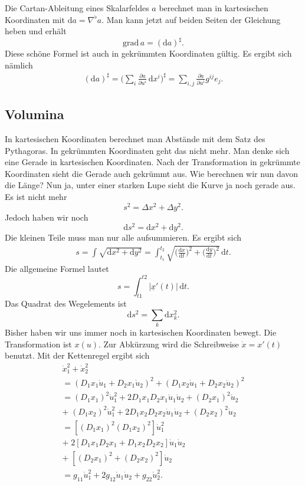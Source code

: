 \documentclass[a4paper,10pt,fleqn,twocolumn,twoside]{article}
\begin{document}
Die Cartan-Ableitung eines Skalarfeldes $a$ berechnet man in
kartesischen Koordinaten mit
$\mathrm da = \nabla^\flat a$. 
Man kann jetzt auf beiden Seiten der Gleichung heben und erhält
\[\mathrm{grad}\,a = (\mathrm da)^\sharp.\]
Diese schöne Formel ist auch in gekrümmten Koordinaten gültig.
Es ergibt sich nämlich
\begin{gather*}
(\mathrm da)^\sharp
= \Big(\sum_i \frac{\partial a}{\partial u^i}
\,\mathrm dx^i\Big)^\sharp
= \sum_{i,j} \frac{\partial a}{\partial u^i}g^{ij}e_j.
\end{gather*}

\subsection{Volumina}

In kartesischen Koordinaten berechnet man Abstände mit dem Satz des
Pythagoras. In gekrümmten Koordinaten geht das nicht mehr. Man denke
sich eine Gerade in kartesischen Koordinaten. Nach der Transformation
in gekrümmte Koordinaten sieht die Gerade auch gekrümmt aus. Wie
berechnen wir nun davon die Länge? Nun ja, unter einer starken Lupe
sieht die Kurve ja noch gerade aus. Es ist nicht mehr
\[s^2 = \Delta x^2+\Delta y^2.\]
Jedoch haben wir noch
\[\mathrm ds^2 = \mathrm dx^2+\mathrm dy^2.\]
Die kleinen Teile muss man nur alle aufsummieren. Es ergibt sich
\begin{gather*}
s = \int \sqrt{\mathrm dx^2+\mathrm dy^2}
= \int_{t_1}^{t_2}\sqrt{\Big(\frac{\mathrm dx}{\mathrm dt}\Big)^2
+\Big(\frac{\mathrm dy}{\mathrm dt}\Big)^2}\,\mathrm dt.
\end{gather*}
Die allgemeine Formel lautet
\[s = \int_{t1}^{t2} |\underline x'(t)|\,\mathrm dt.\]
Das Quadrat des Wegelements ist
\[\mathrm ds^2 = \sum_k \mathrm dx_k^2.\]
Bisher haben wir uns immer noch in kartesischen Koordinaten bewegt.
Die Transformation ist $x(u)$. Zur Abkürzung wird die Schreibweise
$\dot x=x'(t)$ benutzt. Mit der Kettenregel ergibt sich
\begin{gather*}
\dot x_1^2+\dot x_2^2\\
= (D_1x_1\dot u_1+D_2x_1\dot u_2)^2
+ (D_1x_2\dot u_1+D_2x_2\dot u_2)^2\\
= (D_1x_1)^2\dot u_1^2+2D_1x_1D_2x_1\dot u_1\dot u_2
+ (D_2x_1)^2\dot u_2\\
+\; (D_1x_2)^2\dot u_1^2+2D_1x_2D_2x_2\dot u_1\dot u_2
+ (D_2x_2)^2\dot u_2\\
= [(D_1x_1)^2(D_1x_2)^2]\dot u_1^2\\
+\; 2[D_1x_1D_2x_1+D_1x_2D_2x_2]\dot u_1\dot u_2\\
+\; [(D_2x_1)^2+(D_2x_2)^2]\dot u_2\\
= g_{11}\dot u_1^2+2g_{12}\dot u_1\dot u_2+g_{22}\dot u_2^2.
\end{gather*}
\end{document}
